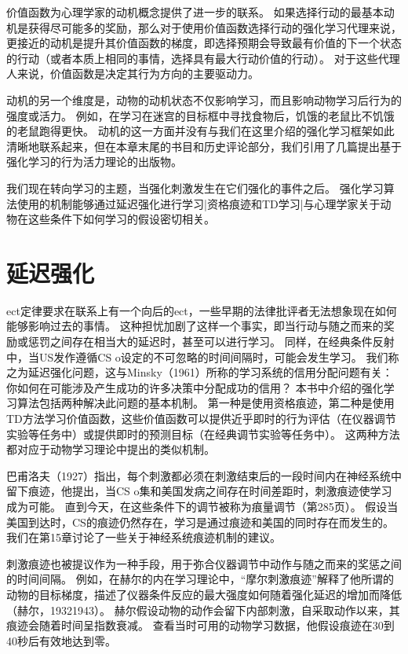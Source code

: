 {价值函数为心理学家的动机概念提供了进一步的联系。
如果选择行动的最基本动机是获得尽可能多的奖励，那么对于使用价值函数选择行动的强化学习代理来说，更接近的动机是提升其价值函数的梯度，即选择预期会导致最有价值的下一个状态的行动（或者本质上相同的事情，选择具有最大行动价值的行动）。
对于这些代理人来说，价值函数是决定其行为方向的主要驱动力。


动机的另一个维度是，动物的动机状态不仅影响学习，而且影响动物学习后行为的强度或活力。
例如，在学习在迷宫的目标框中寻找食物后，饥饿的老鼠比不饥饿的老鼠跑得更快。
动机的这一方面并没有与我们在这里介绍的强化学习框架如此清晰地联系起来，但在本章末尾的书目和历史评论部分，我们引用了几篇提出基于强化学习的行为活力理论的出版物。


我们现在转向学习的主题，当强化刺激发生在它们强化的事件之后。
强化学习算法使用的机制能够通过延迟强化进行学习|资格痕迹和TD学习|与心理学家关于动物在这些条件下如何学习的假设密切相关。


\section{延迟强化}


ect定律要求在联系上有一个向后的ect，一些早期的法律批评者无法想象现在如何能够影响过去的事情。
这种担忧加剧了这样一个事实，即当行动与随之而来的奖励或惩罚之间存在相当大的延迟时，甚至可以进行学习。
同样，在经典条件反射中，当US发作遵循CS o设定的不可忽略的时间间隔时，可能会发生学习。
我们称之为延迟强化问题，这与Minsky（1961）所称的学习系统的信用分配问题有关：你如何在可能涉及产生成功的许多决策中分配成功的信用？
本书中介绍的强化学习算法包括两种解决此问题的基本机制。
第一种是使用资格痕迹，第二种是使用TD方法学习价值函数，这些价值函数可以提供近乎即时的行为评估（在仪器调节实验等任务中）或提供即时的预测目标（在经典调节实验等任务中）。
这两种方法都对应于动物学习理论中提出的类似机制。


巴甫洛夫（1927）指出，每个刺激都必须在刺激结束后的一段时间内在神经系统中留下痕迹，他提出，当CS o集和美国发病之间存在时间差距时，刺激痕迹使学习成为可能。
直到今天，在这些条件下的调节被称为痕量调节（第285页）。
假设当美国到达时，CS的痕迹仍然存在，学习是通过痕迹和美国的同时存在而发生的。我们在第15章讨论了一些关于神经系统痕迹机制的建议。


刺激痕迹也被提议作为一种手段，用于弥合仪器调节中动作与随之而来的奖惩之间的时间间隔。
例如，在赫尔的内在学习理论中，“摩尔刺激痕迹”解释了他所谓的动物的目标梯度，描述了仪器条件反应的最大强度如何随着强化延迟的增加而降低（赫尔，19321943）。
赫尔假设动物的动作会留下内部刺激，自采取动作以来，其痕迹会随着时间呈指数衰减。
查看当时可用的动物学习数据，他假设痕迹在30到40秒后有效地达到零。




}
